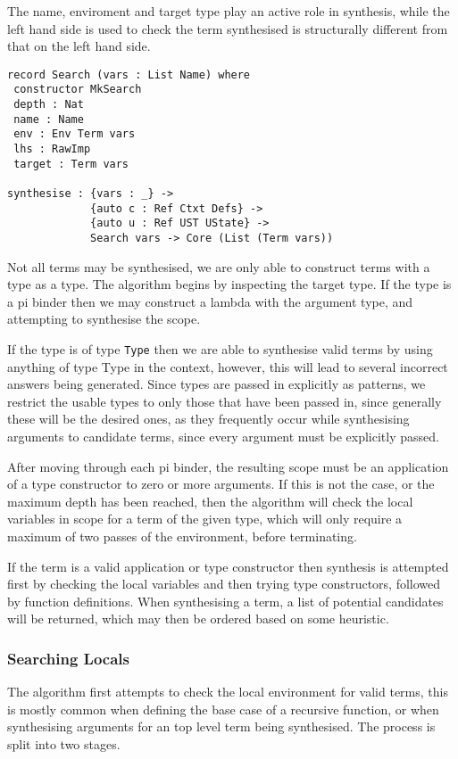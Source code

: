 \documentclass[a4paper]{article}
\begin{document}
The name, enviroment and target type play an active role in synthesis, while the left hand side is used to check the term 
synthesised is structurally different from that on the left hand side. 

\begin{center}
\begin{verbatim}
record Search (vars : List Name) where
 constructor MkSearch
 depth : Nat
 name : Name
 env : Env Term vars
 lhs : RawImp
 target : Term vars 

synthesise : {vars : _} -> 
			 {auto c : Ref Ctxt Defs} -> 
			 {auto u : Ref UST UState} ->
			 Search vars -> Core (List (Term vars))

\end{verbatim}
\end{center}


Not all terms may be synthesised, we are only able to construct terms with a type as a type. The algorithm begins by 
inspecting the target type. If the type is a pi binder then we may construct a lambda with  
the argument type, and attempting to synthesise the scope.

If the type is of type \texttt{Type} then we are able to synthesise valid terms by using anything of type Type in the context,
however, this will lead to several incorrect answers being generated. Since types are passed in explicitly as patterns, 
we restrict the usable types to only those that have been passed in, since generally these will be the desired ones, 
as they frequently occur while synthesising arguments to candidate terms, since every argument must be explicitly passed.

After moving through each pi binder, the resulting scope must be an application of a type constructor to zero or more
arguments. If this is not the case, or the maximum depth has been reached, then the algorithm will check the local 
variables in scope for a term of the given type, which will only require a maximum of two passes of the environment,
before terminating. 

If the term is a valid application or type constructor then synthesis is attempted first by checking the 
local variables and then trying type constructors, followed by function definitions. When synthesising a term, a list of potential 
candidates will be returned, which may then be ordered based on some heuristic.

\subsubsection{Searching Locals}
\label{sec:orgbc2d082}
The algorithm first attempts to check the local environment for valid terms, this is mostly common when defining the 
base case of a recursive function, or when synthesising arguments for an top level term being synthesised. The process is split 
into two stages. 
\end{document}
